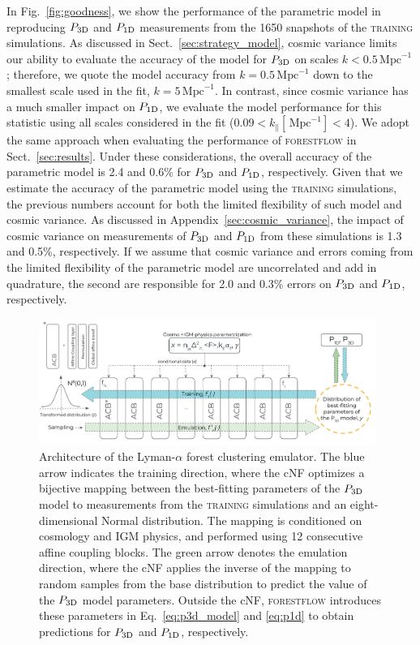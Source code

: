 \documentclass[longauth]{aa}
\newcommand{\lyaf}{Lyman-$\alpha$ forest\xspace}
\newcommand{\poned}{\ensuremath{P_{\rm 1D}}\xspace}
\newcommand{\pthreed}{\ensuremath{P_{\rm 3D}}\xspace}
\newcommand{\forestflow}{\textsc{forestflow}\xspace}
\newcommand{\lacehc}{\textsc{training}\xspace}
\newcommand{\iMpc}{\ensuremath{\,\mathrm{Mpc}^{-1}}}
\begin{document}
In Fig.~\ref{fig:goodness}, we show the performance of the parametric model in reproducing \pthreed and \poned measurements from the 1650 snapshots of the \lacehc simulations. As discussed in Sect.~\ref{sec:strategy_model}, cosmic variance limits our ability to evaluate the accuracy of the model for \pthreed on scales $k<0.5\iMpc$; therefore, we quote the model accuracy from $k=0.5\iMpc$ down to the smallest scale used in the fit, $k=5\iMpc$. In contrast, since cosmic variance has a much smaller impact on \poned, we evaluate the model performance for this statistic using all scales considered in the fit ($0.09<k_\parallel[\iMpc]<4$). We adopt the same approach when evaluating the performance of \forestflow in Sect.~\ref{sec:results}. Under these considerations, the overall accuracy of the parametric model is 2.4 and 0.6\% for \pthreed and \poned, respectively. Given that we estimate the accuracy of the parametric model using the \lacehc simulations, the previous numbers account for both the limited flexibility of such model and cosmic variance. As discussed in Appendix~\ref{sec:cosmic_variance}, the impact of cosmic variance on measurements of \pthreed and \poned from these simulations is 1.3 and 0.5\%, respectively. If we assume that cosmic variance and errors coming from the limited flexibility of the parametric model are uncorrelated and add in quadrature, the second are responsible for 2.0 and 0.3\% errors on \pthreed and \poned, respectively.



\begin{figure}
    \includegraphics[width= 0.98\textwidth]{figures/network_architecture.png} 
    \centering
    \caption{Architecture of the \lyaf clustering emulator. The blue arrow indicates the training direction, where the cNF optimizes a bijective mapping between the best-fitting parameters of the \pthreed model to measurements from the \lacehc simulations and an eight-dimensional Normal distribution. The mapping is conditioned on cosmology and IGM physics, and performed using 12 consecutive affine coupling blocks. The green arrow denotes the emulation direction, where the cNF applies the inverse of the mapping to random samples from the base distribution to predict the value of the \pthreed model parameters. Outside the cNF, \forestflow introduces these parameters in Eq.~\ref{eq:p3d_model} and \ref{eq:p1d} to obtain predictions for \pthreed and \poned, respectively.}
    \label{fig:net_architecture}
 \end{figure}
\end{document}
